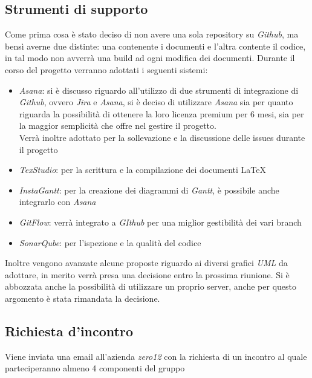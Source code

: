 \documentclass[a4paper,12pt]{article}
\begin{document}
	\subsection{Strumenti di supporto}
	Come prima cosa è stato deciso di non avere una sola repository su \textit{Github}, ma bensì averne due distinte: una contenente i documenti e l'altra contente il codice, in tal modo non avverrà una build ad ogni modifica dei documenti.
	Durante il corso del progetto verranno adottati i seguenti sistemi:
	\begin{itemize}
		\item\textit{Asana}: si è discusso riguardo all'utilizzo di due strumenti di integrazione di \textit{Github}, ovvero \textit{Jira} e \textit{Asana}, si è deciso di utilizzare \textit{Asana} sia per quanto riguarda la possibilità di ottenere la loro licenza premium per 6 mesi, sia per la maggior semplicità che offre nel gestire il progetto. \\
		Verrà inoltre adottato per la sollevazione e la discussione delle issues durante il progetto
		\item \textit{TexStudio}: per la scrittura e la compilazione dei documenti \LaTeX 
		\item \textit{InstaGantt}: per la creazione dei diagrammi di \textit{Gantt}, è possibile anche integrarlo con \textit{Asana}
		\item \textit{GitFlow}: verrà integrato a \textit{GIthub} per una miglior gestibilità dei vari branch
		\item \textit{SonarQube}: per l'ispezione e la qualità del codice		
	\end{itemize}	
	Inoltre vengono avanzate alcune proposte riguardo ai diversi grafici \textit{UML} da adottare, in merito verrà presa una decisione entro la prossima riunione. Si è abbozzata anche la possibilità di utilizzare un proprio server, anche per questo argomento è stata rimandata la decisione.
	\subsection{Richiesta d'incontro}
	Viene inviata una email all'azienda \textit{zero12} con la richiesta di un incontro al quale parteciperanno almeno 4 componenti del gruppo
\end{document}
